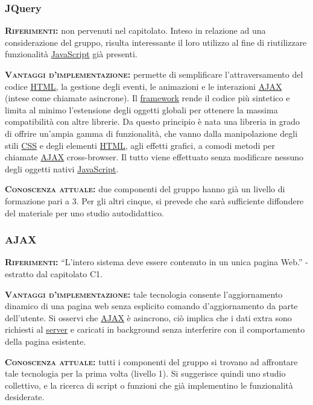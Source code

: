 \subsubsection{JQuery}
\begin{description}
	\item{\scshape\bfseries Riferimenti:} non pervenuti nel capitolato. Inteso in relazione ad una considerazione del gruppo, risulta interessante il loro utilizzo al fine di riutilizzare funzionalità \underline{JavaScript} già presenti.
	
	\item{\scshape\bfseries Vantaggi d'implementazione:} permette di semplificare l'attraversamento del codice \underline{HTML}, la gestione degli eventi, le animazioni e le interazioni \underline{AJAX} (intese come chiamate asincrone). Il \underline{framework} rende il codice più sintetico e limita al minimo l'estensione degli oggetti globali per ottenere la massima compatibilità con altre librerie. Da questo principio è nata una libreria in grado di offrire un'ampia gamma di funzionalità, che vanno dalla manipolazione degli stili \underline{CSS} e degli elementi \underline{HTML}, agli effetti grafici, a comodi metodi per chiamate \underline{AJAX} cross-browser. Il tutto viene effettuato senza modificare nessuno degli oggetti nativi \underline{JavaScript}.
	
	\item{\scshape\bfseries Conoscenza attuale:} due componenti del gruppo hanno già un livello di formazione pari a 3. Per gli altri cinque, si prevede che sarà sufficiente diffondere del materiale per uno studio autodidattico.
\end{description}

\subsubsection{AJAX}
\begin{description}
	\item{\scshape\bfseries Riferimenti:} ``L'intero sistema deve essere contenuto in un unica pagina Web.'' - estratto dal capitolato C1.

	\item{\scshape\bfseries Vantaggi d'implementazione:} tale tecnologia consente l'aggiornamento dinamico di una pagina web senza esplicito comando d'aggiornamento da parte dell'utente. Si osservi che \underline{AJAX} è asincrono, ciò implica che i dati extra sono richiesti al \underline{server} e caricati in background senza interferire con il comportamento della pagina esistente.
	
	\item{\scshape\bfseries Conoscenza attuale:} tutti i componenti del gruppo si trovano ad affrontare tale tecnologia per la prima volta (livello 1). Si suggerisce quindi uno studio collettivo, e la ricerca di script o funzioni che già implementino le funzionalità desiderate.
\end{description}

